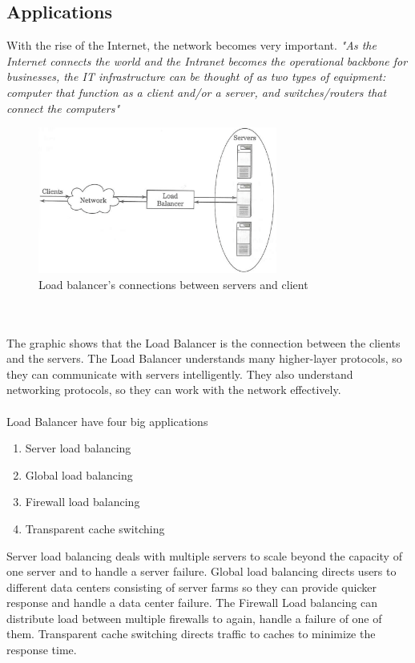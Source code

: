 \documentclass[12p]{article}
\begin{document}
	\subsection{Applications}
	With the rise of the Internet, the network becomes very important. \textit{"As the Internet connects the world and the Intranet becomes the operational backbone for businesses, the IT infrastructure can be thought of as two types of equipment: computer that function as a client and/or a server, and switches/routers that connect the computers"} \cite{lb_SFC}\\
	\begin{figure}[h!]
		\centering
		\includegraphics[width=0.7\textwidth]{img/basic.png}
		\caption{Load balancer's connections between servers and client}
	\end{figure}\\\\
	The graphic shows that the Load Balancer is the connection between the clients and the servers. The Load Balancer understands many higher-layer protocols, so they can communicate with servers intelligently. They also understand networking protocols, so they can work with the network effectively.\\\\
	Load Balancer have four big applications
	\begin{enumerate}
		\item Server load balancing
		\item Global load balancing
		\item Firewall load balancing
		\item Transparent cache switching
	\end{enumerate}
	Server load balancing deals with multiple servers to scale beyond the capacity of one server and to handle a server failure. Global load balancing directs users to different data centers consisting of server farms so they can provide quicker response and handle a data center failure. The Firewall Load balancing can distribute load between multiple firewalls to again, handle a failure of one of them. Transparent cache switching directs traffic to caches to minimize the response time. \\ \\
\end{document}
